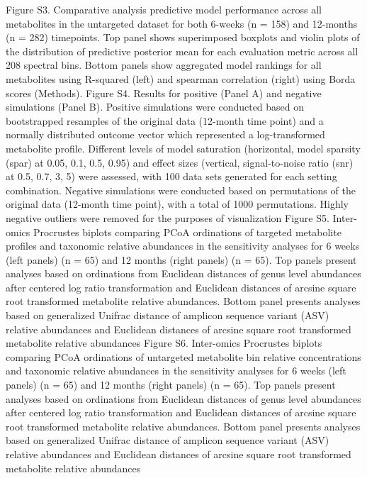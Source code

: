 Figure S3. Comparative analysis predictive model performance across all metabolites in the untargeted dataset for both 6-weeks (n = 158) and 12-months (n = 282) timepoints. Top panel shows superimposed boxplots and violin plots of the distribution of predictive posterior mean for each evaluation metric across all 208 spectral bins. Bottom panels show aggregated model rankings for all metabolites using R-squared (left) and spearman correlation (right) using Borda scores (Methods).
Figure S4. Results for positive (Panel A) and negative simulations (Panel B). Positive simulations were conducted based on bootstrapped resamples of the original data (12-month time point) and a normally distributed outcome vector which represented a log-transformed metabolite profile. Different levels of model saturation (horizontal, model sparsity (spar) at 0.05, 0.1, 0.5, 0.95) and effect sizes (vertical, signal-to-noise ratio (snr) at 0.5, 0.7, 3, 5) were assessed, with 100 data sets generated for each setting combination. Negative simulations were conducted based on permutations of the original data (12-month time point), with a total of 1000 permutations. Highly negative outliers were removed for the purposes of visualization
Figure S5. Inter-omics Procrustes biplots comparing PCoA ordinations of targeted metabolite profiles and taxonomic relative abundances in the sensitivity analyses for 6 weeks (left panels) (n = 65) and 12 months (right panels) (n = 65). Top panels present analyses based on ordinations from Euclidean distances of genus level abundances after centered log ratio transformation and Euclidean distances of arcsine square root transformed metabolite relative abundances. Bottom panel presents analyses based on generalized Unifrac distance of amplicon sequence variant (ASV) relative abundances and Euclidean distances of arcsine square root transformed metabolite relative abundances
Figure S6. Inter-omics Procrustes biplots comparing PCoA ordinations of untargeted metabolite bin relative concentrations and taxonomic relative abundances in the sensitivity analyses for 6 weeks (left panels) (n = 65) and 12 months (right panels) (n = 65). Top panels present analyses based on ordinations from Euclidean distances of genus level abundances after centered log ratio transformation and Euclidean distances of arcsine square root transformed metabolite relative abundances. Bottom panel presents analyses based on generalized Unifrac distance of amplicon sequence variant (ASV) relative abundances and Euclidean distances of arcsine square root transformed metabolite relative abundances
